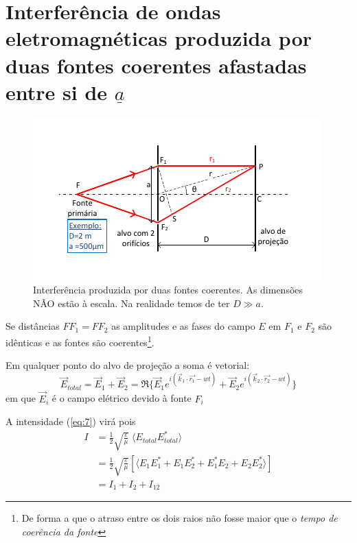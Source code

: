 \documentclass[a4paper,12pt]{article}
\begin{document}
\section{\sf Interferência de ondas eletromagnéticas produzida por duas fontes coerentes afastadas entre si de $\underline{a}$ }
\begin{figure}[h!tb]
	\centering 
	\includegraphics[width=0.8
	\textwidth]{interf} \caption{Interferência produzida por duas fontes coerentes. As dimensões NÃO estão à escala. Na realidade temos de ter $D \gg a$. \label{fig:1}} 
\end{figure}

Se distâncias $F F_1 = F F_2$ as amplitudes e as fases do campo $E$ em $F_1$ e $F_2$ são idênticas e as fontes são coerentes\footnote{De forma a que o atraso entre os dois raios não fosse maior que o \emph{tempo de coerência da fonte}}.

Em qualquer ponto do alvo de projeção a soma é vetorial: 
\begin{equation}
	\label{eq:8} \vec{E}_{total} = \vec{E}_1 + \vec{E}_2  = \Re \{\vec{E}_1 e^{ i (\vec{k}_1 \cdot \vec{r_1} -wt )} + \vec{E}_2 e^{ i (\vec{k}_2 \cdot \vec{r_2} -wt )} \} 
\end{equation}
em que $\vec{E}_i$ é o campo elétrico devido à fonte $F_i$

A intensidade (\ref{eq:7}) virá pois 
\begin{align}
	I &= \frac{1}{2}\sqrt{\frac{ \varepsilon}{\mu}} \; \langle E_{total} E^*_{total} \rangle \nonumber \\
	&= \frac{1}{2}\sqrt{\frac{ \varepsilon}{\mu}} \left[ \langle E_1 E^*_1 + E_1 E^*_2 + E^*_1 E_2 + E_2 E^*_2 \rangle \right] \nonumber \\
	&= I_1 + I_2 +I_{12} 
\end{align}
\end{document}
